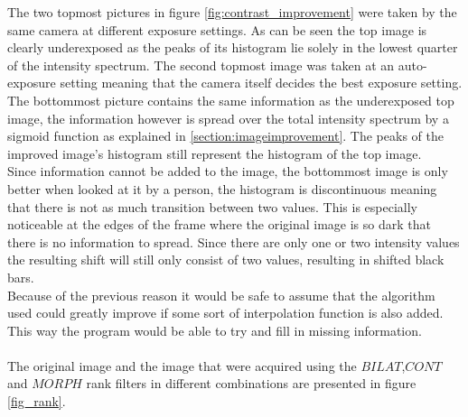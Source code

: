 The two topmost pictures in figure \ref{fig:contrast_improvement} were taken by the same camera at different exposure settings. As can be seen the top image is clearly underexposed as the peaks of its histogram lie solely in the lowest quarter of the intensity spectrum. The second topmost image was taken at an auto-exposure setting meaning that the camera itself decides the best exposure setting. The bottommost picture contains the same information as the underexposed top image, the information however is spread over the total intensity spectrum by a sigmoid function as explained in \ref{section:imageimprovement}. The peaks of the improved image's histogram still represent the histogram of the top image.\\
Since information cannot be added to the image, the bottommost image is only better when looked at it by a person, the histogram is discontinuous meaning that there is not as much transition between two values. This is especially noticeable at the edges of the frame where the original image is so dark that there is no information to spread. Since there are only one or two intensity values the resulting shift will still only consist of two values, resulting in shifted black bars.\\
Because of the previous reason it would be safe to assume that the algorithm used could greatly improve if some sort of interpolation function is also added. This way the program would be able to try and fill in missing information.\\
\\
The original image and the image that were acquired using the $BILAT$,$CONT$ and $MORPH$ rank filters in different combinations are presented in figure \ref{fig_rank}.

